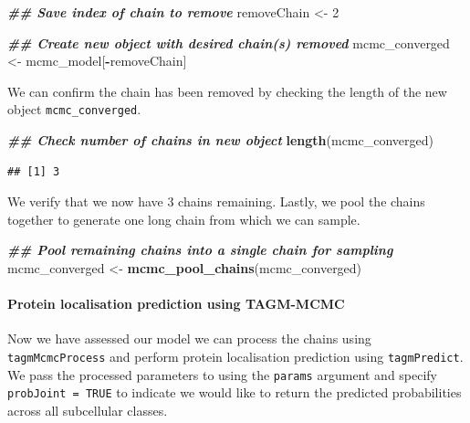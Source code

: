 \documentclass[9pt,a4paper,]{extarticle}
\newenvironment{Shaded}{\begin{snugshade}}{\end{snugshade}}
\newcommand{\DecValTok}[1]{\textcolor[rgb]{0.00,0.00,0.81}{#1}}
\newcommand{\DocumentationTok}[1]{\textcolor[rgb]{0.56,0.35,0.01}{\textbf{\textit{#1}}}}
\newcommand{\FunctionTok}[1]{\textcolor[rgb]{0.13,0.29,0.53}{\textbf{#1}}}
\newcommand{\NormalTok}[1]{#1}
\newcommand{\OtherTok}[1]{\textcolor[rgb]{0.56,0.35,0.01}{#1}}
\newcommand{\SpecialCharTok}[1]{\textcolor[rgb]{0.81,0.36,0.00}{\textbf{#1}}}
\begin{document}
\begin{Shaded}
\begin{Highlighting}[]
\DocumentationTok{\#\# Save index of chain to remove}
\NormalTok{removeChain }\OtherTok{\textless{}{-}} \DecValTok{2} 

\DocumentationTok{\#\# Create new object with desired chain(s) removed}
\NormalTok{mcmc\_converged }\OtherTok{\textless{}{-}}\NormalTok{ mcmc\_model[}\SpecialCharTok{{-}}\NormalTok{removeChain] }
\end{Highlighting}
\end{Shaded}

We can confirm the chain has been removed by checking the length of the new
object \texttt{mcmc\_converged}.

\begin{Shaded}
\begin{Highlighting}[]
\DocumentationTok{\#\# Check number of chains in new object}
\FunctionTok{length}\NormalTok{(mcmc\_converged)}
\end{Highlighting}
\end{Shaded}

\begin{verbatim}
## [1] 3
\end{verbatim}

We verify that we now have 3 chains remaining. Lastly, we pool the chains together
to generate one long chain from which we can sample.

\begin{Shaded}
\begin{Highlighting}[]
\DocumentationTok{\#\# Pool remaining chains into a single chain for sampling}
\NormalTok{mcmc\_converged }\OtherTok{\textless{}{-}} \FunctionTok{mcmc\_pool\_chains}\NormalTok{(mcmc\_converged)}
\end{Highlighting}
\end{Shaded}

\paragraph{Protein localisation prediction using TAGM-MCMC}\label{protein-localisation-prediction-using-tagm-mcmc}

Now we have assessed our model we can process the chains using \texttt{tagmMcmcProcess}
and perform protein localisation prediction using \texttt{tagmPredict}. We pass the
processed parameters to using the \texttt{params} argument and specify \texttt{probJoint\ =\ TRUE}
to indicate we would like to return the predicted probabilities across all
subcellular classes.
\end{document}

